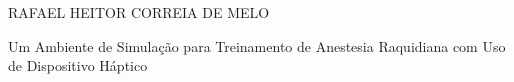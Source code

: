 \cleardoublepage


\pagestyle{ruledheader}
\setcounter{page}{1}

\cleardoublepage
\thispagestyle{empty}

\vspace{-60mm}

\begin{center}
   {\large RAFAEL HEITOR CORREIA DE MELO}\\
   \vspace{7mm}

   Um Ambiente de Simulação para Treinamento de Anestesia Raquidiana com Uso de Dispositivo Háptico\\
  \vspace{10mm}
\end{center}

